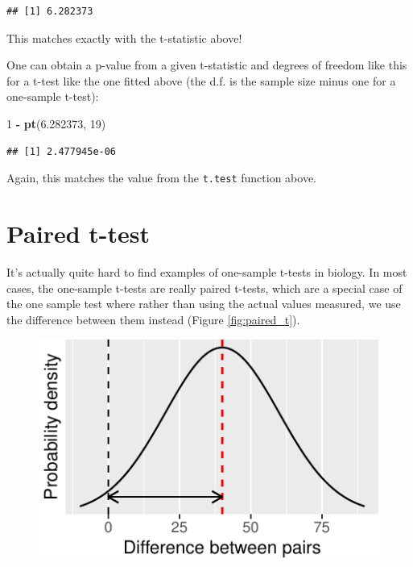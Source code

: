 \documentclass[
  a4paperpaper,
]{book}
\newenvironment{Shaded}{\begin{snugshade}}{\end{snugshade}}
\newcommand{\DecValTok}[1]{\textcolor[rgb]{0.00,0.00,0.81}{#1}}
\newcommand{\FloatTok}[1]{\textcolor[rgb]{0.00,0.00,0.81}{#1}}
\newcommand{\KeywordTok}[1]{\textcolor[rgb]{0.13,0.29,0.53}{\textbf{#1}}}
\newcommand{\NormalTok}[1]{#1}
\newcommand{\OperatorTok}[1]{\textcolor[rgb]{0.81,0.36,0.00}{\textbf{#1}}}
\newcommand{\StringTok}[1]{\textcolor[rgb]{0.31,0.60,0.02}{#1}}
\begin{document}
\begin{verbatim}
## [1] 6.282373
\end{verbatim}

This matches exactly with the t-statistic above!

One can obtain a p-value from a given t-statistic and degrees of freedom like this for a t-test like the one fitted above (the d.f. is the sample size minus one for a one-sample t-test):

\begin{Shaded}
\begin{Highlighting}[]
\DecValTok{1} \OperatorTok{{-}}\StringTok{ }\KeywordTok{pt}\NormalTok{(}\FloatTok{6.282373}\NormalTok{, }\DecValTok{19}\NormalTok{)}
\end{Highlighting}
\end{Shaded}

\begin{verbatim}
## [1] 2.477945e-06
\end{verbatim}

Again, this matches the value from the \texttt{t.test} function above.

\hypertarget{paired-t-test}{%
\section{Paired t-test}\label{paired-t-test}}

It's actually quite hard to find examples of one-sample t-tests in biology. In most cases, the one-sample t-tests are really paired t-tests, which are a special case of the one sample test where rather than using the actual values measured, we use the difference between them instead (Figure \ref{fig:paired_t}).

\begin{figure}

{\centering \includegraphics{BB852_files/figure-latex/paired_t-1} 

}

\end{figure}
\end{document}
